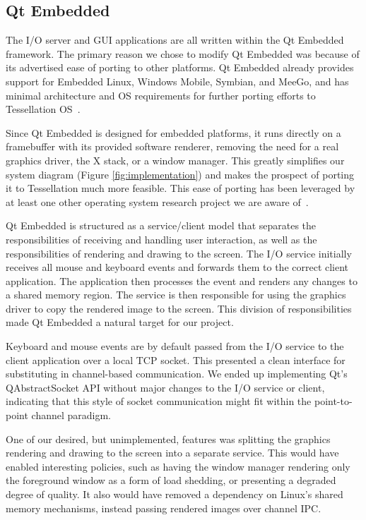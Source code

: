 \documentclass[letterpaper,twocolumn,11pt]{article}
\begin{document}
\subsection{Qt Embedded}

The I/O server and GUI applications are all written within the Qt Embedded framework. The primary reason we chose to modify Qt Embedded was because of its advertised ease of porting to other platforms. Qt Embedded already provides support for Embedded Linux, Windows Mobile, Symbian, and MeeGo, and has minimal architecture and OS requirements for further porting efforts to Tessellation OS~\cite{qtembedded}.

Since Qt Embedded is designed for embedded platforms, it runs directly on a framebuffer with its provided software renderer, removing the need for a real graphics driver, the X stack, or a window manager. This greatly simplifies our system diagram (Figure \ref{fig:implementation}) and makes the prospect of porting it to Tessellation much more feasible. This ease of porting has been leveraged by at least one other operating system research project we are aware of~\cite{ibos}. 

Qt Embedded is structured as a service/client model that separates the responsibilities of receiving and handling user interaction, as well as the responsibilities of rendering and drawing to the screen. The I/O service initially receives all mouse and keyboard events and forwards them to the correct client application. The application then processes the event and renders any changes to a shared memory region. The service is then responsible for using the graphics driver to copy the rendered image to the screen. This division of responsibilities made Qt Embedded a natural target for our project.

Keyboard and mouse events are by default passed from the I/O service to the client application over a local TCP socket. This presented a clean interface for substituting in channel-based communication. We ended up implementing Qt's QAbstractSocket API without major changes to the I/O service or client, indicating that this style of socket communication might fit within the point-to-point channel paradigm.

One of our desired, but unimplemented, features was splitting the graphics rendering and drawing to the screen into a separate service. This would have enabled interesting policies, such as having the window manager rendering only the foreground window as a form of load shedding, or presenting a degraded degree of quality. It also would have removed a dependency on Linux's shared memory mechanisms, instead passing rendered images over channel IPC.
\end{document}
